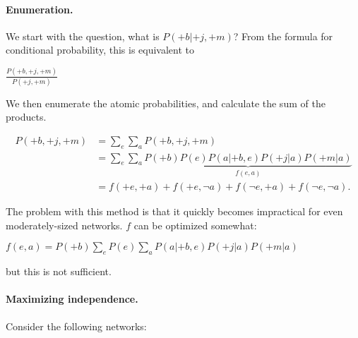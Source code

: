 \documentclass[10pt,a4paper]{article}
\begin{document}
\paragraph{Enumeration.} We start with the question, what is $P(+b | +j, +m)$? From the formula for conditional probability, this is equivalent to
\begin{center}
$\displaystyle\frac{P(+b,+j,+m)}{P(+j,+m)}$
\end{center}
\noindent We then enumerate the atomic probabilities, and calculate the sum of the products.
\begin{center}
\begin{align*}
P(+b,+j,+m) & = \sum_e\sum_aP(+b,+j,+m) \\
 & = \sum_e\sum_a\underbrace{P(+b)P(e)P(a|+b,e)P(+j|a)P(+m|a)}_{f(e,a)} \\
 & = f(+e,+a) + f(+e,\neg a) + f(\neg e,+a) + f(\neg e, \neg a).
\end{align*}
\end{center}
\noindent The problem with this method is that it quickly becomes impractical for even moderately-sized networks. $f$ can be optimized somewhat:
\begin{center}
$\displaystyle f(e,a) = P(+b)\sum_eP(e)\sum_aP(a|+b,e)P(+j|a)P(+m|a)$
\end{center}
\noindent but this is not sufficient.

\paragraph{Maximizing independence.} Consider the following networks:
\end{document}
